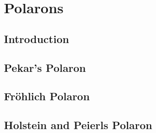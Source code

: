 
\chapter{Polarons} %

\label{Chapter3} %



\section{Introduction}

\section{Pekar's Polaron}

\section{Fr{\"o}hlich Polaron}

\section{Holstein and Peierls Polaron}


